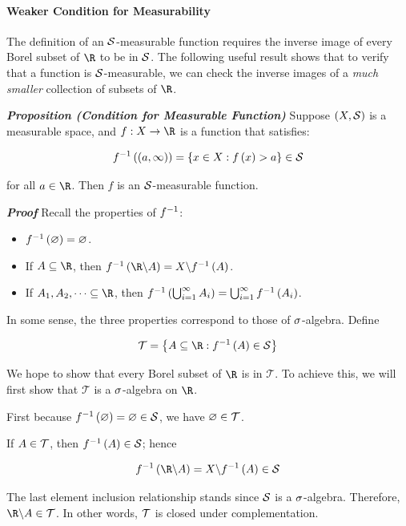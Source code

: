 \documentclass[
]{article}
\begin{document}
\hypertarget{weaker-condition-for-measurability}{%
\paragraph{Weaker Condition for
Measurability}\label{weaker-condition-for-measurability}}

The definition of an \(\S\)-measurable function requires the inverse
image of every Borel subset of \(\R\) to be in \(\S\). The following
useful result shows that to verify that a function is \(\S\)-measurable,
we can check the inverse images of a \emph{much smaller} collection of
subsets of \(\R\).

\emph{\textbf{Proposition (Condition for Measurable Function)}} Suppose
\(\pr{X,\S}\) is a measurable space, and \(f:X\to \R\) is a function
that satisfies:

\[\inv f\pr{\pr{a,\infty}} = \brace{x\in X:f\pr{x}>a} \in \S\]

for all \(a\in \R\). Then \(f\) is an \(\S\)-measurable function.

\emph{\textbf{Proof}} Recall the properties of \(\inv f\):

\begin{itemize}
\item
  \(\inv f \pr{\empty} = \empty\).
\item
  If \(A\se \R\), then
  \(\inv f\pr{\R\backslash A} = X\backslash \inv f\pr{A}\).
\item
  If \(A_1,A_2,\cdots\se \R\), then
  \(\inv f \pr{\uinf[i]A_i} = \uinf[i]\inv f\pr{A_i}\).
\end{itemize}

In some sense, the three properties correspond to those of
\(\s\)-algebra. Define

\[\mathcal T = \brace{A\se \R:\inv f\pr A\in \S}\]

We hope to show that every Borel subset of \(\R\) is in \(\mathcal T\).
To achieve this, we will first show that \(\mathcal T\) is a
\(\s\)-algebra on \(\R\).

First because \(\inv f\pr \empty = \empty \in \S\), we have
\(\empty\in \mathcal T\).

If \(A\in \T\), then \(\inv f\pr A\in \S\); hence

\[\inv f\pr{\R\backslash A} = X\backslash \inv f\pr A\in \S\]

The last element inclusion relationship stands since \(\S\) is a
\(\s\)-algebra. Therefore, \(\R\backslash A\in \T\). In other words,
\(\T\) is closed under complementation.
\end{document}
